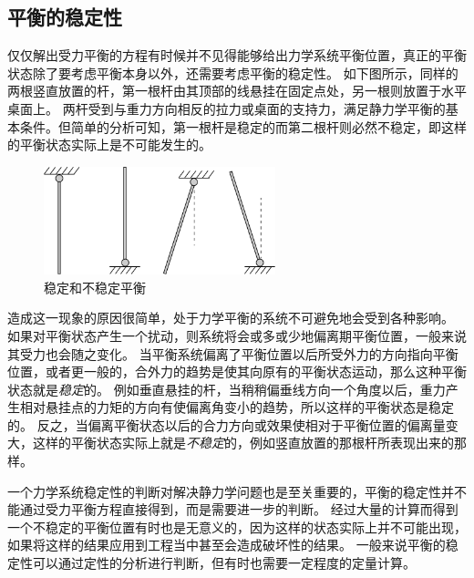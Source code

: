 \subsection{平衡的稳定性}
仅仅解出受力平衡的方程有时候并不见得能够给出力学系统平衡位置，真正的平衡状态除了要考虑平衡本身以外，还需要考虑平衡的稳定性。
如下图所示，同样的两根竖直放置的杆，第一根杆由其顶部的线悬挂在固定点处，另一根则放置于水平桌面上。
两杆受到与重力方向相反的拉力或桌面的支持力，满足静力学平衡的基本条件。但简单的分析可知，第一根杆是稳定的而第二根杆则必然不稳定，即这样的平衡状态实际上是不可能发生的。

\begin{figure}[htbp]
\begin{center}
\includegraphics[width=0.6\textwidth]{images/static-force-28}
\caption{稳定和不稳定平衡}
\label{default}
\end{center}
\end{figure}

造成这一现象的原因很简单，处于力学平衡的系统不可避免地会受到各种影响。
如果对平衡状态产生一个扰动，则系统将会或多或少地偏离期平衡位置，一般来说其受力也会随之变化。
当平衡系统偏离了平衡位置以后所受外力的方向指向平衡位置，或者更一般的，合外力的趋势是使其向原有的平衡状态运动，那么这种平衡状态就是\emph{稳定}的。
例如垂直悬挂的杆，当稍稍偏垂线方向一个角度以后，重力产生相对悬挂点的力矩的方向有使偏离角变小的趋势，所以这样的平衡状态是稳定的。
反之，当偏离平衡状态以后的合力方向或效果使相对于平衡位置的偏离量变大，这样的平衡状态实际上就是\emph{不稳定}的，例如竖直放置的那根杆所表现出来的那样。

一个力学系统稳定性的判断对解决静力学问题也是至关重要的，平衡的稳定性并不能通过受力平衡方程直接得到，而是需要进一步的判断。
经过大量的计算而得到一个不稳定的平衡位置有时也是无意义的，因为这样的状态实际上并不可能出现，如果将这样的结果应用到工程当中甚至会造成破坏性的结果。
一般来说平衡的稳定性可以通过定性的分析进行判断，但有时也需要一定程度的定量计算。


